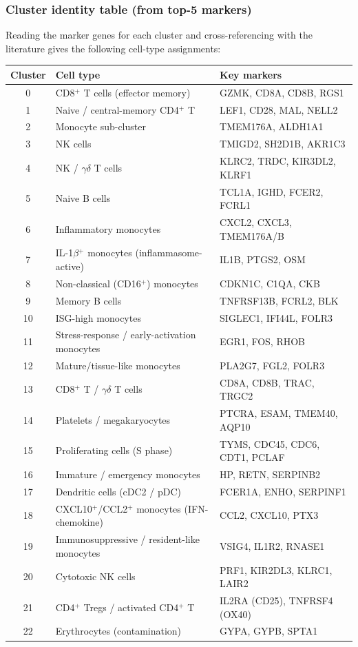\documentclass[11pt, a4paper]{article}
\begin{document}
\subsubsection*{Cluster identity table (from top-5 markers)}

Reading the marker genes for each cluster and cross-referencing with the
literature gives the following cell-type assignments:

\begin{center}
\small
\begin{tabular}{cll}
\hline
\textbf{Cluster} & \textbf{Cell type} & \textbf{Key markers} \\
\hline
0  & CD8$^+$ T cells (effector memory) & GZMK, CD8A, CD8B, RGS1 \\
1  & Naive / central-memory CD4$^+$ T & LEF1, CD28, MAL, NELL2 \\
2  & Monocyte sub-cluster & TMEM176A, ALDH1A1 \\
3  & NK cells                           & TMIGD2, SH2D1B, AKR1C3 \\
4  & NK / $\gamma\delta$ T cells        & KLRC2, TRDC, KIR3DL2, KLRF1 \\
5  & Naive B cells                      & TCL1A, IGHD, FCER2, FCRL1 \\
6  & Inflammatory monocytes             & CXCL2, CXCL3, TMEM176A/B \\
7  & IL-1$\beta$$^+$ monocytes (inflammasome-active) & IL1B, PTGS2, OSM \\
8  & Non-classical (CD16$^+$) monocytes & CDKN1C, C1QA, CKB \\
9  & Memory B cells                     & TNFRSF13B, FCRL2, BLK \\
10 & ISG-high monocytes                 & SIGLEC1, IFI44L, FOLR3 \\
11 & Stress-response / early-activation monocytes & EGR1, FOS, RHOB \\
12 & Mature/tissue-like monocytes       & PLA2G7, FGL2, FOLR3 \\
13 & CD8$^+$ T / $\gamma\delta$ T cells & CD8A, CD8B, TRAC, TRGC2 \\
14 & Platelets / megakaryocytes         & PTCRA, ESAM, TMEM40, AQP10 \\
15 & Proliferating cells (S phase)      & TYMS, CDC45, CDC6, CDT1, PCLAF \\
16 & Immature / emergency monocytes     & HP, RETN, SERPINB2 \\
17 & Dendritic cells (cDC2 / pDC)       & FCER1A, ENHO, SERPINF1 \\
18 & CXCL10$^+$/CCL2$^+$ monocytes (IFN-chemokine) & CCL2, CXCL10, PTX3 \\
19 & Immunosuppressive / resident-like monocytes & VSIG4, IL1R2, RNASE1 \\
20 & Cytotoxic NK cells                 & PRF1, KIR2DL3, KLRC1, LAIR2 \\
21 & CD4$^+$ Tregs / activated CD4$^+$ T & IL2RA (CD25), TNFRSF4 (OX40) \\
22 & Erythrocytes (contamination)       & GYPA, GYPB, SPTA1 \\
\hline
\end{tabular}
\end{center}
\end{document}
